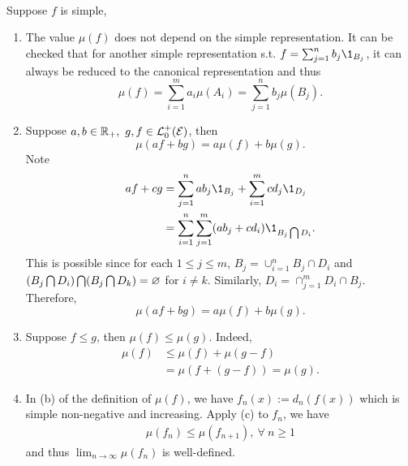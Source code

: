 \begin{remark}\ \\
 Suppose $f$ is simple,
 \begin{enumerate}[label = (\alph*)]
     \item The value $\mu(f)$ does not depend on the simple representation. It can be checked that for another simple representation s.t. $f = \sum_{j=1}^n b_j \1_{B_j}$, it can always be reduced to the canonical representation and thus
     \begin{equation*}
         \mu(f) = \sum_{i=1}^m a_i \mu(A_i) = \sum_{j=1}^n b_j \mu(B_j).
     \end{equation*}
     
     \item Suppose $a,b \in \mathbb{R}_+,\ g,f \in \mathcal{L}_0^+(\mathcal{E})$, then
     \begin{equation*}
         \mu(af + bg) = a\mu(f) + b \mu(g).
     \end{equation*}
     Note 
     \begin{align*}
         af + cg &= \sum_{j=1}^n ab_j \1_{B_j}+ \sum_{i=1}^m c d_j \1_{D_j}\\
         &= \sum_{i=1}^n \sum_{j=1}^m (a b_j + c d_i) \1_{B_j \cap D_i}.
     \end{align*}
     This is possible since for each $1 \leq j \leq m$, $B_j = \cup_{i=1}^n B_j \cap D_i$ and $(B_j \bigcap D_i) \bigcap (B_j \bigcap D_k) = \varnothing$ for $i \neq k$. Similarly, $D_i = \cap_{j=1}^m D_i \cap B_j$. Therefore,
     \begin{equation*}
         \mu(af + bg) = a \mu(f) + b \mu(g).
     \end{equation*}
     
     \item Suppose $f \leq g$, then $\mu(f) \leq \mu(g)$. Indeed,
     \begin{align*}
         \mu(f) &\leq \mu(f) + \mu(g - f)\\
         &= \mu(f + (g - f)) = \mu(g).
     \end{align*}
     \item In (b) of the definition of $\mu(f)$, we have $f_n(x) := d_n(f(x))$ which is simple non-negative and increasing. Apply (c) to $f_n$, we have
     \begin{align*}
         \mu(f_n) \leq \mu(f_{n+1}),\ \forall\ n \geq 1
     \end{align*}
     and thus $\lim_{n \to \infty} \mu(f_n)$ is well-defined.
 \end{enumerate}
\end{remark}

